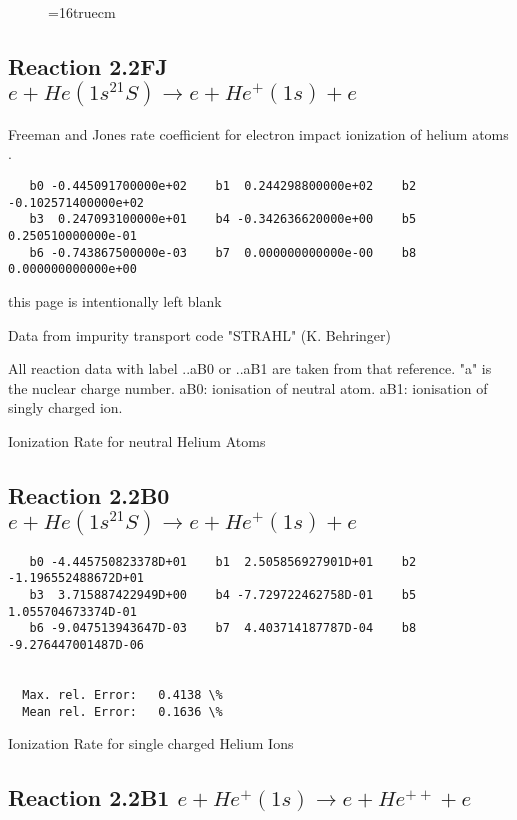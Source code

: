 \documentclass[12pt,dvipdfmx]{article}
\begin{document}
\begin{figure} \label{n2+}
\epsfxsize=16truecm
\end{figure}
\newpage




\subsection{
Reaction 2.2FJ  $e + He(1s^21S) \rightarrow e + He^+(1s) + e$ } Freeman
and Jones rate coefficient for electron impact ionization of helium atoms \cite{kn:Freeman} .

\begin{small}\begin{verbatim}
   b0 -0.445091700000e+02    b1  0.244298800000e+02    b2 -0.102571400000e+02
   b3  0.247093100000e+01    b4 -0.342636620000e+00    b5  0.250510000000e-01
   b6 -0.743867500000e-03    b7  0.000000000000e-00    b8  0.000000000000e+00
\end{verbatim}\end{small}
\newpage
this page is intentionally left blank
\newpage

Data from impurity transport code "STRAHL" (K. Behringer) \cite{kn:Behringer}

All reaction data with label ..aB0 or ..aB1 are taken from that
reference. "a" is the nuclear charge number. aB0: ionisation of neutral atom. aB1: ionisation of singly charged ion.

Ionization Rate for neutral Helium Atoms



\subsection{
Reaction 2.2B0   $e + He(1s^21S) \rightarrow e + He^+(1s) + e $
}
\begin{small}\begin{verbatim}
   b0 -4.445750823378D+01    b1  2.505856927901D+01    b2 -1.196552488672D+01
   b3  3.715887422949D+00    b4 -7.729722462758D-01    b5  1.055704673374D-01
   b6 -9.047513943647D-03    b7  4.403714187787D-04    b8 -9.276447001487D-06


  Max. rel. Error:   0.4138 \%
  Mean rel. Error:   0.1636 \%
\end{verbatim}\end{small}

  Ionization Rate for single charged Helium Ions

\subsection{
Reaction 2.2B1   $e + He^+(1s) \rightarrow e + He^{++} + e$
}
\end{document}
